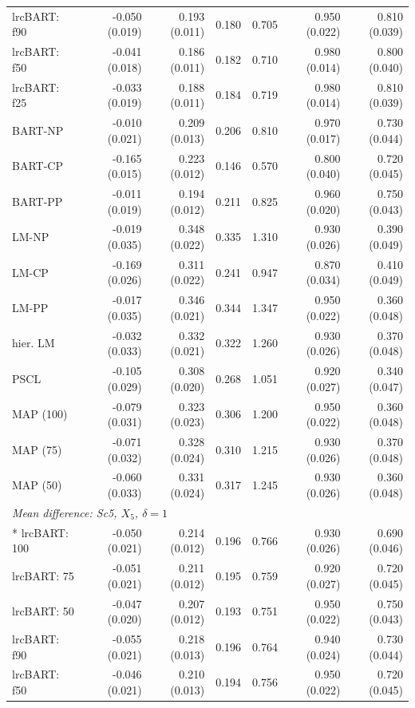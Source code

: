 \begin{landscape}
\begin{longtable}{lrrrrrr}
lrcBART: f90 & -0.050 (0.019) & 0.193 (0.011) & 0.180 & 0.705 & 0.950 (0.022) & 0.810 (0.039) \\
lrcBART: f50 & -0.041 (0.018) & 0.186 (0.011) & 0.182 & 0.710 & 0.980 (0.014) & 0.800 (0.040) \\
lrcBART: f25 & -0.033 (0.019) & 0.188 (0.011) & 0.184 & 0.719 & 0.980 (0.014) & 0.810 (0.039) \\
BART-NP & -0.010 (0.021) & 0.209 (0.013) & 0.206 & 0.810 & 0.970 (0.017) & 0.730 (0.044) \\
BART-CP & -0.165 (0.015) & 0.223 (0.012) & 0.146 & 0.570 & 0.800 (0.040) & 0.720 (0.045) \\
BART-PP & -0.011 (0.019) & 0.194 (0.012) & 0.211 & 0.825 & 0.960 (0.020) & 0.750 (0.043) \\
LM-NP & -0.019 (0.035) & 0.348 (0.022) & 0.335 & 1.310 & 0.930 (0.026) & 0.390 (0.049) \\
LM-CP & -0.169 (0.026) & 0.311 (0.022) & 0.241 & 0.947 & 0.870 (0.034) & 0.410 (0.049) \\
LM-PP & -0.017 (0.035) & 0.346 (0.021) & 0.344 & 1.347 & 0.950 (0.022) & 0.360 (0.048) \\
hier. LM & -0.032 (0.033) & 0.332 (0.021) & 0.322 & 1.260 & 0.930 (0.026) & 0.370 (0.048) \\
PSCL & -0.105 (0.029) & 0.308 (0.020) & 0.268 & 1.051 & 0.920 (0.027) & 0.340 (0.047) \\
MAP (100) & -0.079 (0.031) & 0.323 (0.023) & 0.306 & 1.200 & 0.950 (0.022) & 0.360 (0.048) \\
MAP (75) & -0.071 (0.032) & 0.328 (0.024) & 0.310 & 1.215 & 0.930 (0.026) & 0.370 (0.048) \\
MAP (50) & -0.060 (0.033) & 0.331 (0.024) & 0.317 & 1.245 & 0.930 (0.026) & 0.360 (0.048) \\
\multicolumn{7}{l}{\strut\textit{Mean difference: Sc5, $X_5$, $\delta=1$}}\\*
lrcBART: 100 & -0.050 (0.021) & 0.214 (0.012) & 0.196 & 0.766 & 0.930 (0.026) & 0.690 (0.046) \\
lrcBART: 75 & -0.051 (0.021) & 0.211 (0.012) & 0.195 & 0.759 & 0.920 (0.027) & 0.720 (0.045) \\
lrcBART: 50 & -0.047 (0.020) & 0.207 (0.012) & 0.193 & 0.751 & 0.950 (0.022) & 0.750 (0.043) \\
lrcBART: f90 & -0.055 (0.021) & 0.218 (0.013) & 0.196 & 0.764 & 0.940 (0.024) & 0.730 (0.044) \\
lrcBART: f50 & -0.046 (0.021) & 0.210 (0.013) & 0.194 & 0.756 & 0.950 (0.022) & 0.720 (0.045) \\

\end{longtable}
\end{landscape}
